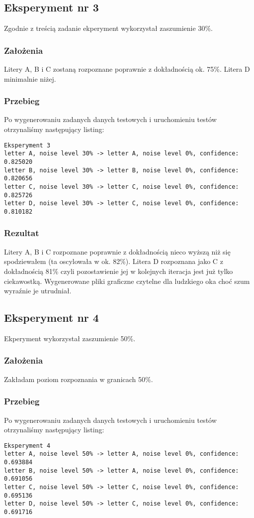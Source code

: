 \documentclass[12pt]{article}
\begin{document}
\subsection{Eksperyment nr 3}
Zgodnie z treścią zadanie ekperyment wykorzystał zaszumienie 30\%.
\subsubsection{Założenia}
Litery A, B i C zostaną rozpoznane poprawnie z dokładnością ok. 75\%. Litera D minimalnie niżej.
\subsubsection{Przebieg}
Po wygenerowaniu zadanych danych testowych i uruchomieniu testów otrzynaliśmy następujący listing:
\begin{verbatim}
Eksperyment 3
letter A, noise level 30% -> letter A, noise level 0%, confidence: 0.825020
letter B, noise level 30% -> letter B, noise level 0%, confidence: 0.820656
letter C, noise level 30% -> letter C, noise level 0%, confidence: 0.825726
letter D, noise level 30% -> letter C, noise level 0%, confidence: 0.810182
\end{verbatim}

\subsubsection{Rezultat}
Litery A, B i C rozpoznane poprawnie z dokładnością nieco wyższą niż się spodziewałem (ta oscylowała w ok. 82\%). Litera D rozpoznana jako C z dokładnością 81\% czyli pozostawienie jej w kolejnych iteracja jest już tylko ciekawostką. Wygenerowane pliki graficzne czytelne dla ludzkiego oka choć szum wyraźnie je utrudniał.\\

\subsection{Eksperyment nr 4}
Ekperyment wykorzystał zaszumienie 50\%.
\subsubsection{Założenia}
Zakładam poziom rozpoznania w granicach 50\%.
\subsubsection{Przebieg}
Po wygenerowaniu zadanych danych testowych i uruchomieniu testów otrzynaliśmy następujący listing:
\begin{verbatim}
Eksperyment 4
letter A, noise level 50% -> letter A, noise level 0%, confidence: 0.693884
letter B, noise level 50% -> letter A, noise level 0%, confidence: 0.691056
letter C, noise level 50% -> letter C, noise level 0%, confidence: 0.695136
letter D, noise level 50% -> letter C, noise level 0%, confidence: 0.691716
\end{verbatim}
\end{document}
